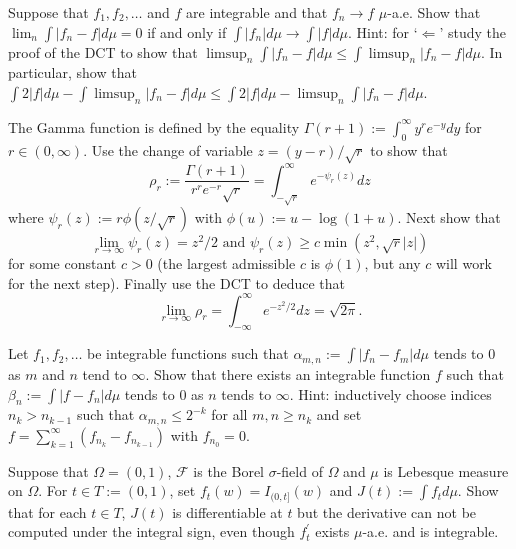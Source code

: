 \begin{exercise}
Suppose that $f_1, f_2, \ldots$ and $f$ are integrable and that $f_n\rightarrow f$ $\mu$-a.e. Show that $\lim_n \int |f_n - f|d\mu=0$ if and only if $\int |f_n| d\mu\rightarrow \int |f|d\mu$. Hint: for `$\Leftarrow$' study the proof of the DCT to show that $\limsup_n\int |f_n - f|d\mu\leq \int \limsup_n |f_n-f|d\mu$. In particular, show that $\int 2|f|d\mu -\int \limsup_n|f_n-f|d\mu\leq \int 2|f|d\mu - \limsup_n\int|f_n-f|d\mu $.
\end{exercise}

\begin{exercise}
The Gamma function is defined by the equality $\Gamma(r+1):=\int_0^\infty y^r e^{-y} dy$ for $r\in(0,\infty)$. Use the change of variable $z=(y-r)/\sqrt{r}$ to show that
\[ \rho_r:= \frac{\Gamma(r+1)}{r^{r} e^{-r}\sqrt{r}} = \int_{-\sqrt{r}}^\infty e^{-\psi_r(z)}dz \]
where $\psi_r(z):=r\phi(z/\sqrt{r})$ with $\phi(u):= u -\log(1+u)$. Next show that
\[ \lim_{r\rightarrow \infty} \psi_r(z)=z^2/2\text{  and  }\psi_r(z)\geq c\min(z^2,\sqrt{r}|z|) \]
for some constant $c>0$ (the largest admissible $c$ is $\phi(1)$, but any $c$ will work for the next step). Finally use the DCT to deduce that
\[ \lim_{r\rightarrow\infty} \rho_r= \int_{-\infty}^\infty e^{-z^2/2}dz = \sqrt{2\pi}. \]
\end{exercise}





\begin{exercise}[{\bf $L^1$ is complete}]
Let $f_1, f_2, \ldots$ be integrable functions such that $\alpha_{m,n}:=\int |f_n-f_m|d\mu$ tends to $0$ as $m$ and $n$ tend to $\infty$. Show that there exists an integrable function $f$ such that $\beta_n:=\int |f-f_n|d\mu$ tends to $0$ as $n$ tends to $\infty$. Hint: inductively choose indices $n_k> n_{k-1}$ such that $\alpha_{m,n}\leq 2^{-k}$ for all $m,n\geq n_k$ and set $f=\sum_{k=1}^\infty (f_{n_k}- f_{n_{k-1}})$ with $f_{n_0}=0$.
\end{exercise}

\begin{exercise}
Suppose that $\Omega = (0,1)$, $\mathcal F$ is the Borel $\sigma$-field of $\Omega$ and $\mu$ is Lebesque measure on $\Omega$. For $t\in T:=(0,1)$, set $f_t(w)= I_{(0,t]}(w)$ and $J(t):= \int f_t d\mu$. Show that for each $t\in T$, $J(t)$ is differentiable at $t$ but the derivative can not be computed under the integral sign, even though $f_t^\prime$ exists $\mu$-a.e. and is integrable.
\end{exercise}



